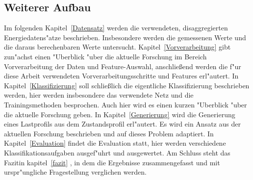 \subsection{Weiterer Aufbau}
\label{Weiterer Aufbau}
	Im folgenden Kapitel~\ref{Datensatz} werden die verwendeten, disaggregierten Energiedatens"atze beschrieben. Insbesondere werden die gemessenen Werte und die daraus berechenbaren Werte untersucht. 
	Kapitel~\ref{Vorverarbeitung} gibt zun"achst einen "Uberblick "uber die aktuelle Forschung im Bereich Vorverarbeitung der Daten und Feature-Auswahl, anschlie{\ss}end werden die f"ur diese Arbeit verwendeten Vorverarbeitungsschritte und Features erl"autert.
	In Kapitel~\ref{Klassifizierung} soll schlie{\ss}lich die eigentliche Klassifizierung beschrieben werden, hier werden insbesondere das verwendete Netz und die Trainingsmethoden besprochen. Auch hier wird es einen kurzen "Uberblick "uber die aktuelle Forschung geben.
	In Kapitel~\ref{Generierung} wird die Generierung eines Lastprofils aus dem Zustandsprofil erl"autert. Es wird ein Ansatz aus der aktuellen Forschung beschrieben und auf dieses Problem adaptiert. 
	In Kapitel~\ref{Evaluation} findet die Evaluation statt, hier werden verschiedene Klassifikationsaufgaben ausgef"uhrt und ausgewertet. 
	Am Schluss steht das Fazitin kapitel~\ref{fazit} , in dem die Ergebnisse zusammengefasst und mit urspr"ungliche Fragestellung verglichen werden. 